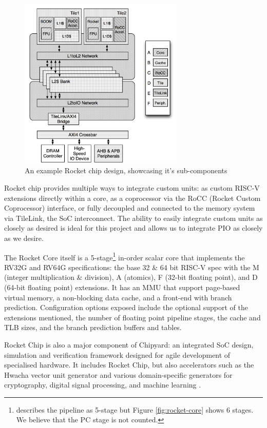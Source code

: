 \begin{figure}[h!]
    \centering
    \includegraphics[width=0.7\textwidth]{../img/rocket-chip.png}
    \caption{An example Rocket chip design, showcasing it's sub-components \cite{rocketchip}}
    \label{fig:rocket}
\end{figure}

Rocket chip provides multiple ways to integrate custom units: as custom RISC-V extensions directly within a core, as a coprocessor via the RoCC (Rocket Custom Coprocessor) interface, or fully decoupled and connected to the memory system via TileLink, the SoC interconnect. The ability to easily integrate custom units as closely as desired is ideal for this project and allows us to integrate PIO as closely as we desire.

The Rocket Core itself is a 5-stage\footnote{\cite{rocketchip} describes the pipeline as 5-stage but Figure \ref{fig:rocket-core} shows 6 stages. We believe that the PC stage is not counted.} in-order scalar core that implements the RV32G and RV64G specifications: the base 32 \& 64 bit RISC-V spec with the M (integer multiplication \& division), A (atomics), F (32-bit floating point), and D (64-bit floating point) extensions. It has an MMU that support page-based virtual memory, a non-blocking data cache, and a front-end with branch prediction. Configuration options exposed include the optional support of the extensions mentioned, the number of floating point pipeline stages, the cache and TLB sizes, and the branch prediction buffers and tables.

Rocket Chip is also a major component of Chipyard: an integrated SoC design, simulation and verification framework designed for agile development of specialised hardware. It includes Rocket Chip, but also accelerators such as the Hwacha vector unit generator and various domain-specific generators for cryptography, digital signal processing, and machine learning \cite{chipyard}.

